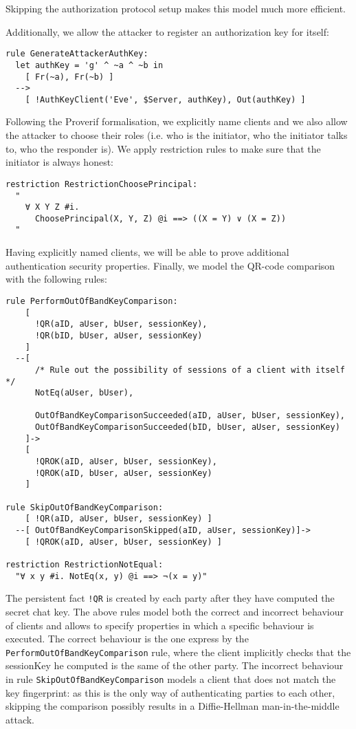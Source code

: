 Skipping the authorization protocol setup makes this model much more efficient.

Additionally, we allow the attacker to register an authorization key for itself:

\begin{lstlisting}
rule GenerateAttackerAuthKey:
  let authKey = 'g' ^ ~a ^ ~b in
    [ Fr(~a), Fr(~b) ]
  -->
    [ !AuthKeyClient('Eve', $Server, authKey), Out(authKey) ]
\end{lstlisting}


Following the Proverif formalisation, we explicitly name clients and we also allow the attacker to choose their roles (i.e. who is the initiator, who the initiator talks to, who the responder is). We apply restriction rules to make sure that the initiator is always honest: %

\begin{lstlisting}
restriction RestrictionChoosePrincipal:
  "
    ∀ X Y Z #i.
      ChoosePrincipal(X, Y, Z) @i ==> ((X = Y) ∨ (X = Z))
  "
\end{lstlisting}

Having explicitly named clients, we will be able to prove additional authentication security properties.
Finally, we model the QR-code comparison with the following rules:

\begin{lstlisting}
rule PerformOutOfBandKeyComparison:
    [ 
      !QR(aID, aUser, bUser, sessionKey),
      !QR(bID, bUser, aUser, sessionKey)
    ]
  --[ 
      /* Rule out the possibility of sessions of a client with itself */
      NotEq(aUser, bUser),

      OutOfBandKeyComparisonSucceeded(aID, aUser, bUser, sessionKey),
      OutOfBandKeyComparisonSucceeded(bID, bUser, aUser, sessionKey)
    ]->
    [
      !QROK(aID, aUser, bUser, sessionKey),
      !QROK(aID, bUser, aUser, sessionKey)
    ]

rule SkipOutOfBandKeyComparison:
    [ !QR(aID, aUser, bUser, sessionKey) ]
  --[ OutOfBandKeyComparisonSkipped(aID, aUser, sessionKey)]->
    [ !QROK(aID, aUser, bUser, sessionKey) ]

restriction RestrictionNotEqual:
  "∀ x y #i. NotEq(x, y) @i ==> ¬(x = y)"
\end{lstlisting}

The persistent fact \lstinline{!QR} is created by each party after they have computed the secret chat key. The above rules model both the correct and incorrect behaviour of clients and allows to specify properties in which a specific behaviour is executed. The correct behaviour is the one express by the \lstinline{PerformOutOfBandKeyComparison} rule, where the client implicitly checks that the sessionKey he computed is the same of the other party. The incorrect behaviour in rule \lstinline{SkipOutOfBandKeyComparison} models a client that does not match the key fingerprint: as this is the only way of authenticating parties to each other, skipping the comparison possibly results in a Diffie-Hellman man-in-the-middle attack.

